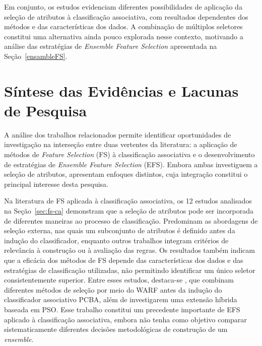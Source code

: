 Em conjunto, os estudos evidenciam diferentes possibilidades de aplicação da seleção de atributos à classificação associativa, com resultados dependentes dos métodos e das características dos dados. A combinação de múltiplos seletores constitui uma alternativa ainda pouco explorada nesse contexto, motivando a análise das estratégias de \textit{Ensemble Feature Selection} apresentada na Seção~\ref{ensambleFS}.




\section{Síntese das Evidências e Lacunas de Pesquisa}
\label{sec:consideracoes-relacionados}

A análise dos trabalhos relacionados permite identificar oportunidades de investigação na interseção entre duas vertentes da literatura: a aplicação de métodos de \textit{Feature Selection} (FS) à classificação associativa e o desenvolvimento de estratégias de \textit{Ensemble Feature Selection} (EFS). Embora ambas investiguem a seleção de atributos, apresentam enfoques distintos, cuja integração constitui o principal interesse desta pesquisa.

Na literatura de FS aplicada à classificação associativa, os 12 estudos analisados na Seção~\ref{sec:fs-ca} demonstram que a seleção de atributos pode ser incorporada de diferentes maneiras ao processo de classificação. Predominam as abordagens de seleção externa, nas quais um subconjunto de atributos é definido antes da indução do classificador, enquanto outros trabalhos integram critérios de relevância à construção ou à avaliação das regras. Os resultados também indicam que a eficácia dos métodos de FS depende das características dos dados e das estratégias de classificação utilizadas, não permitindo identificar um único seletor consistentemente superior. Entre esses estudos, destaca-se , que combinam diferentes métodos de seleção por meio do WARF antes da indução do classificador associativo PCBA, além de investigarem uma extensão híbrida baseada em PSO. Esse trabalho constitui um precedente importante de EFS aplicado à classificação associativa, embora não tenha como objetivo comparar sistematicamente diferentes decisões metodológicas de construção de um \textit{ensemble}.

